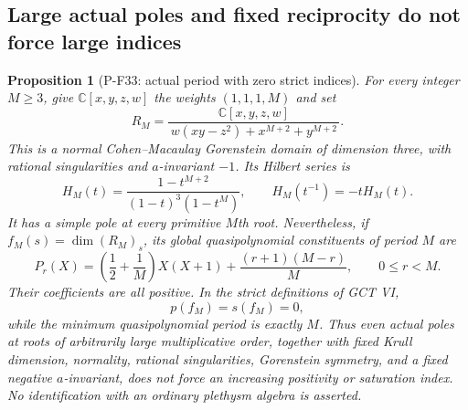 \documentclass[11pt,a4paper]{article}
\newtheorem{proposition}{Proposition}[section]
\begin{document}
\subsection{Large actual poles and fixed reciprocity do not force large indices}

\begin{proposition}[P-F33: actual period with zero strict indices]
\label{prop:largeperiodzeroindices}
For every integer $M\ge3$, give
$\mathbb C[x,y,z,w]$ the weights $(1,1,1,M)$ and set
\[
 R_M=\frac{\mathbb C[x,y,z,w]}
 {\,w(xy-z^2)+x^{M+2}+y^{M+2}\,}.
 \tag{P-F33a}
\]
This is a normal Cohen--Macaulay Gorenstein domain of
dimension three, with rational singularities and
$a$-invariant $-1$. Its Hilbert series is
\[
 H_M(t)=\frac{1-t^{M+2}}{(1-t)^3(1-t^M)},
 \qquad H_M(t^{-1})=-tH_M(t).
 \tag{P-F33b}
\]
It has a simple pole at every primitive $M$th root.
Nevertheless, if $f_M(s)=\dim(R_M)_s$, its global
quasipolynomial constituents of period $M$ are
\[
 P_r(X)=\left(\frac12+\frac1M\right)X(X+1)
                +\frac{(r+1)(M-r)}M,
 \qquad 0\le r<M.
 \tag{P-F33c}
\]
Their coefficients are all positive. In the strict
definitions of GCT VI,
\[
 p(f_M)=s(f_M)=0,
 \tag{P-F33d}
\]
while the minimum quasipolynomial period is exactly $M$.
Thus even actual poles at roots of arbitrarily large
multiplicative order, together with fixed
Krull dimension, normality, rational singularities,
Gorenstein symmetry, and a fixed negative $a$-invariant,
does not force an increasing positivity or saturation index.
No identification with an ordinary plethysm algebra is asserted.
\end{proposition}
\end{document}
